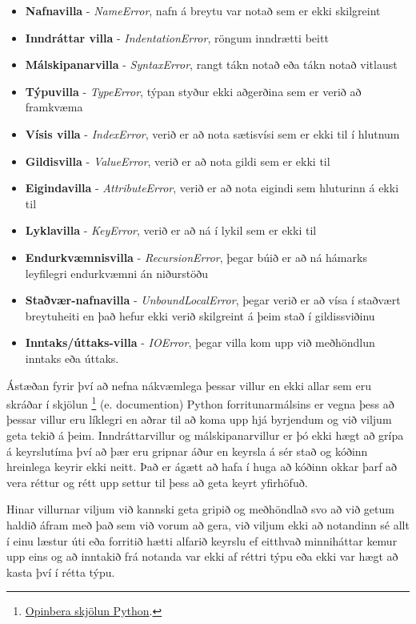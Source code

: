 \begin{itemize}
	\item \textbf{Nafnavilla} - \emph{NameError}, nafn á breytu var notað sem er ekki skilgreint
	\item \textbf{Inndráttar villa }- \emph{IndentationError}, röngum inndrætti beitt
	\item \textbf{Málskipanarvilla} - \emph{SyntaxError}, rangt tákn notað eða tákn notað vitlaust
	\item \textbf{Týpuvilla} - \emph{TypeError}, týpan styður ekki aðgerðina sem er verið að framkvæma
	\item \textbf{Vísis villa} - \emph{IndexError}, verið er að nota sætisvísi sem er ekki til í hlutnum
	\item \textbf{Gildisvilla} - \emph{ValueError}, verið er að nota gildi sem er ekki til
	\item \textbf{Eigindavilla} - \emph{AttributeError}, verið er að nota eigindi sem hluturinn á ekki til
	\item \textbf{Lyklavilla} - \emph{KeyError}, verið er að ná í lykil sem er ekki til
	\item \textbf{Endurkvæmnisvilla} - \emph{RecursionError}, þegar búið er að ná hámarks leyfilegri endurkvæmni án niðurstöðu
	\item \textbf{Staðvær-nafnavilla} - \emph{UnboundLocalError}, þegar verið er að vísa í staðvært breytuheiti en það hefur ekki verið skilgreint á þeim stað í gildissviðinu
	\item \textbf{Inntaks/úttaks-villa} - \emph{IOError}, þegar villa kom upp við meðhöndlun inntaks eða úttaks.
\end{itemize}
\vspace{0.5cm}
Ástæðan fyrir því að nefna nákvæmlega þessar villur en ekki allar sem eru skráðar í skjölun \footnote{\href{https://docs.python.org/}{Opinbera skjölun Python}.} (e. documention) Python forritunarmálsins er vegna þess að þessar villur eru líklegri en aðrar til að koma upp hjá byrjendum og við viljum geta tekið á þeim.
Inndráttarvillur og málskipanarvillur er þó ekki hægt að grípa á keyrslutíma því að þær eru gripnar áður en keyrsla á sér stað og kóðinn hreinlega keyrir ekki neitt.
Það er ágætt að hafa í huga að kóðinn okkar þarf að vera réttur og rétt upp settur til þess að geta keyrt yfirhöfuð.

Hinar villurnar viljum við kannski geta gripið og meðhöndlað svo að við getum haldið áfram með það sem við vorum að gera, við viljum ekki að notandinn sé allt í einu læstur úti eða forritið hætti alfarið keyrslu ef eitthvað minniháttar kemur upp eins og að inntakið frá notanda var ekki af réttri týpu eða ekki var hægt að kasta því í rétta týpu.

